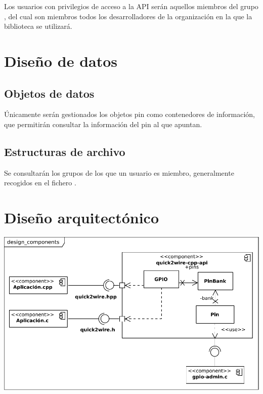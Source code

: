 \documentclass[letterpaper,10pt,spanish]{sphinxmanual}
\begin{document}
Los usuarios con privilegios de acceso a la API serán aquellos miembros del grupo , del cual son miembros todos los desarrolladores de la organización en la que la biblioteca se utilizará.


\section{Diseño de datos}
\label{design/data:diseno-de-datos}\label{design/data::doc}

\subsection{Objetos de datos}
\label{design/data:objetos-de-datos}
Únicamente serán gestionados los objetos pin como contenedores de información, que permitirán consultar la información del pin al que apuntan.


\subsection{Estructuras de archivo}
\label{design/data:estructuras-de-archivo}
Se consultarán los grupos de los que un usuario es miembro, generalmente recogidos en el fichero .


\section{Diseño arquitectónico}
\label{design/architecture::doc}\label{design/architecture:diseno-arquitectonico}
{\hfill\includegraphics{design_components.pdf}\hfill}
\end{document}
